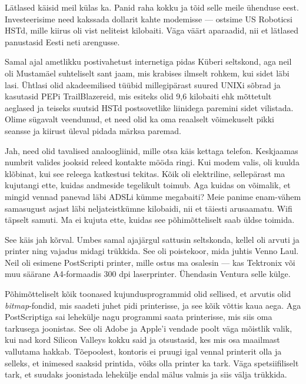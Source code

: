 Lätlased käisid meil külas ka. Panid raha kokku ja tõid selle meile 
ühenduse eest. Investeerisime need kakssada dollarit kahte modemisse --- ostsime US Roboticsi HSTd, mille kiirus oli vist neliteist kilobaiti. Väga väärt aparaadid, nii et lätlased panustasid Eesti neti 
arengusse.

Samal ajal ametlikku postivahetust internetiga pidas 
Küberi seltskond, aga neil oli Mustamäel suhteliselt sant jaam, mis krabises ilmselt rohkem, kui sidet läbi 
lasi. Ühtlasi olid akadeemilised tüübid millegipärast suured
UNIXi sõbrad ja kasutasid PEPi TrailBlazereid, 
mis esiteks olid 9,6 kilobaiti ehk mõttetult aeglased ja teiseks suutsid HSTd 
postsovetlike liinidega paremini sidet vilistada. Olime 
sügavalt veendunud, et need olid ka oma reaalselt võimekuselt pikki seansse ja 
kiirust üleval pidada märksa paremad. 


Jah, need olid tavalised analoogliinid, mille otsa käis kettaga telefon. 
Keskjaamas numbrit valides jooksid releed kontakte mööda ringi. Kui modem valis, oli kuulda klõbinat, kui see
releega katkestusi tekitas. Kõik oli elektriline, sellepärast ma kujutangi 
ette, kuidas andmeside tegelikult toimub. Aga kuidas on võimalik, et mingid 
vennad panevad läbi ADSLi kümme megabaiti? Meie panime enam-vähem samasugust asjast 
läbi neljateistkümne kilobaidi, nii et täiesti arusaamatu. Wifi täpselt samuti. Ma ei 
kujuta ette, kuidas see põhimõtteliselt saab üldse toimida. 


See käis jah kõrval. Umbes 
samal ajajärgul sattusin seltskonda, kellel oli arvuti ja printer ning vajadus 
midagi trükkida. See oli poistekoor, mida juhtis Venno 
Laul. Neil oli esimene PostScripti printer, mille 
ostus ma osalesin --- kas Tektronix või muu säärane A4-formaadis 
300 dpi laserprinter. Ühendasin Ventura selle külge.

Põhimõtteliselt kõik toonased kujundusprogrammid olid sellised, et arvutis olid 
\emph{bitmap}-fondid, mis saadeti juhet pidi printerisse, ja see kõik võttis kaua 
aega. Aga PostScriptiga sai lehekülje nagu programmi saata 
printerisse, mis siis oma tarkusega joonistas. See oli Adobe ja Apple'i 
vendade poolt väga mõistlik valik, kui nad kord Silicon Valleys kokku said ja 
otsustasid, kes mis osa maailmast vallutama hakkab. Tõepoolest, kontoris ei pruugi 
igal vennal printerit olla ja selleks, et inimesed saaksid printida, 
võiks olla printer ka tark. Väga spetsiifiliselt tark, et suudaks 
joonistada lehekülje endal mälus valmis ja siis välja trükkida. 

